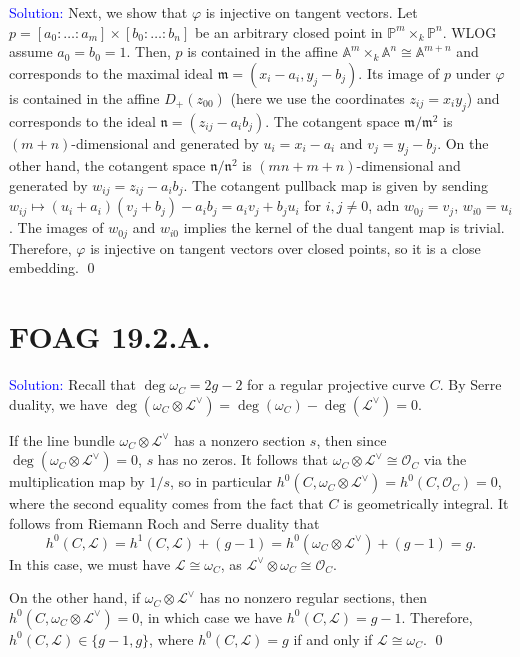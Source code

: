 \documentclass[11pt]{article}
\renewcommand{\AA}{\mathbb{A}}
\newcommand{\PP}{\mathbb{P}}
\newcommand{\cL}{\mathcal{L}}
\newcommand{\cO}{\mathcal{O}}
\newcommand{\km}{\mathfrak{m}}
\newcommand{\kn}{\mathfrak{n}}
\newenvironment{solution}{\begin{trivlist}\item[]{\textcolor{blue}{Solution:}}}{\qed \end{trivlist}}
\begin{document}
\begin{solution}
    Next, we show that $\varphi$ is injective on tangent vectors. Let $p = [a_0: \ldots: a_m] \times [b_0 : \ldots : b_n]$ be an arbitrary closed point in $\PP^m \times_k \PP^n$. WLOG assume $a_0 = b_0 = 1$. Then, $p$ is contained in the affine $\AA^m \times_k \AA^n \cong \AA^{m + n}$ and corresponds to the maximal ideal $\km = (x_i - a_i, y_j - b_j)$. Its image of $p$ under $\varphi$ is contained in the affine $D_+(z_{00})$ (here we use the coordinates $z_{ij} = x_iy_j$) and corresponds to the ideal $\kn = (z_{ij} - a_ib_j)$. The cotangent space $\km / \km^2$ is $(m+n)$-dimensional and generated by $u_i = x_i - a_i$ and $v_j = y_j - b_j$. On the other hand, the cotangent space $\kn / \kn^2$ is $(mn + m + n)$-dimensional and generated by $w_{ij} = z_{ij} - a_i b_j$. The cotangent pullback map is given by sending $w_{ij} \mapsto (u_i + a_i)(v_j + b_j) - a_i b_j = a_i v_j + b_j u_i$ for $i,j \neq 0$, adn $w_{0j} = v_j$, $w_{i0} = u_i$. The images of $w_{0j}$ and $w_{i0}$ implies the kernel of the dual tangent map is trivial. Therefore, $\varphi$ is injective on tangent vectors over closed points, so it is a close embedding. 
\end{solution}

\newpage

\section*{FOAG 19.2.A.}

\begin{solution}
    Recall that $\deg \omega_C = 2g - 2$ for a regular projective curve $C$. By Serre duality, we have $\deg(\omega_C \otimes \cL^{\vee}) = \deg(\omega_C) - \deg(\cL^{\vee}) = 0$. 
    
    If the line bundle $\omega_C \otimes \cL^{\vee}$ has a nonzero section $s$, then since $\deg(\omega_C \otimes \cL^{\vee}) = 0$, $s$ has no zeros. It follows that $\omega_C \otimes \cL^{\vee} \cong \cO_C$ via the multiplication map by $1/s$, so in particular $h^0(C, \omega_C \otimes \cL^{\vee}) = h^0(C, \cO_C) = 0$, where the second equality comes from the fact that $C$ is geometrically integral. It follows from Riemann Roch and Serre duality that 
    \[
        h^0(C, \cL)
        = h^1(C, \cL) + (g - 1)
        = h^0(\omega_C \otimes \cL^{\vee}) + (g - 1)
        = g.
    \]
    In this case, we must have $\cL \cong \omega_C$, as $\cL^{\vee} \otimes \omega_C \cong \cO_C$. 

    On the other hand, if $\omega_C \otimes \cL^{\vee}$ has no nonzero regular sections, then $h^0(C, \omega_C \otimes \cL^{\vee}) = 0$, in which case we have $h^0(C, \cL) = g - 1$. Therefore, $h^0(C, \cL) \in \{g-1, g\}$, where $h^0(C, \cL) = g$ if and only if $\cL \cong \omega_C$. 
\end{solution}
\end{document}
